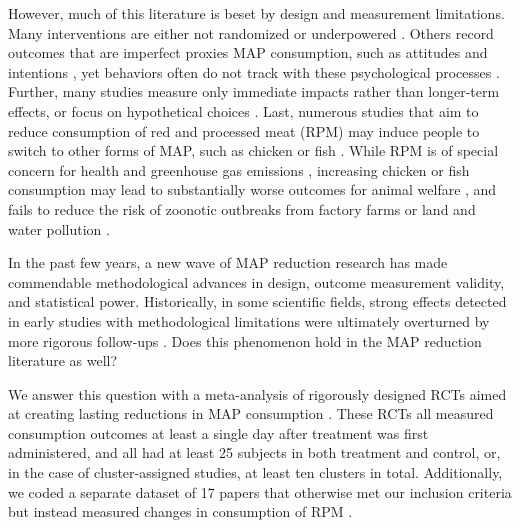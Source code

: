 \documentclass[sn-nature,referee,pdflatex]{sn-jnl}
\begin{document}
However, much of this literature is beset by design and measurement
limitations. Many interventions are either not randomized
\citep{garnett2020} or underpowered \citep{delichatsios2001}. Others
record outcomes that are imperfect proxies MAP consumption, such as
attitudes and intentions \citep{mathur2021effectiveness}, yet behaviors
often do not track with these psychological processes \citep{porat2024}.
Further, many studies measure only immediate impacts
\citep{hansen2021, griesoph2021} rather than longer-term effects, or
focus on hypothetical choices \citep{raghoebar2020, vermeer2010}. Last,
numerous studies that aim to reduce consumption of red and processed
meat (RPM) may induce people to switch to other forms of MAP, such as
chicken or fish \citep{grummon2023}. While RPM is of special concern for
health and greenhouse gas emissions \citep{abete2014, lescinsky2022},
increasing chicken or fish consumption may lead to substantially worse
outcomes for animal welfare \citep{mathur2022ethical}, and fails to
reduce the risk of zoonotic outbreaks from factory farms
\citep{hafez2020} or land and water pollution \citep{grvzinic2023}.

In the past few years, a new wave of MAP reduction research has made
commendable methodological advances in design, outcome measurement
validity, and statistical power. Historically, in some scientific
fields, strong effects detected in early studies with methodological
limitations were ultimately overturned by more rigorous follow-ups
\citep{wykes2008, paluck2019, scheel2021}. Does this phenomenon hold in
the MAP reduction literature as well?

We answer this question with a meta-analysis of rigorously designed RCTs
aimed at creating lasting reductions in MAP consumption
\citep{andersson2021, kanchanachitra2020, abrahamse2007, acharya2004, banerjee2019, bianchi2022, bochmann2017, bschaden2020, carfora2023, cooney2014, cooney2016, feltz2022, haile2021, hatami2018, hennessy2016, jalil2023, mathur2021effectiveness, merrill2009, norris2014, peacock2017, polanco2022, sparkman2021, weingarten2022, piester2020, aldoh2023, allen2002, camp2019, coker2022, sparkman2020, berndsen2005, bertolaso2015, fehrenbach2015, mattson2020, shreedhar2021}.
These RCTs all measured consumption outcomes at least a single day after
treatment was first administered, and all had at least 25 subjects in
both treatment and control, or, in the case of cluster-assigned studies,
at least ten clusters in total. Additionally, we coded a separate
dataset of 17 papers that otherwise met our inclusion criteria but
instead measured changes in consumption of RPM
\citep{anderson2017, carfora2017correlational, carfora2017randomised, carfora2019, carfora2019informational, delichatsios2001talking, dijkstra2022, emmons2005cancer, emmons2005project, jaacks2014, james2015, lee2018, lindstrom2015, perino2022, schatzkin2000, sorensen2005, wolstenholme2020}.
\end{document}
